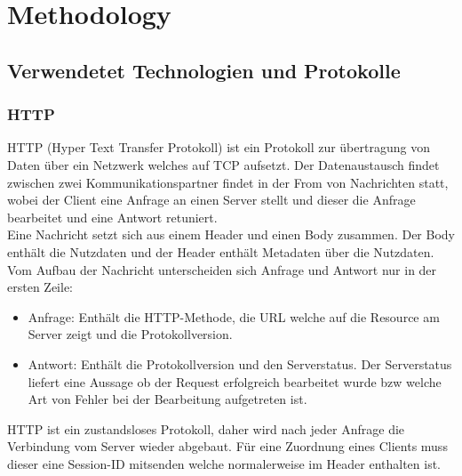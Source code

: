 \section{Methodology}
\label{sec:methodology}

\subsection{Verwendetet Technologien und Protokolle}
\label{sec:Verwendetet Technologien}

\subsubsection{HTTP}
\label{sec:HTTP}

HTTP (Hyper Text Transfer Protokoll) ist ein Protokoll zur übertragung von Daten über ein Netzwerk welches auf TCP aufsetzt.
Der Datenaustausch findet zwischen zwei Kommunikationspartner findet in der From von Nachrichten statt, 
wobei der Client eine Anfrage an einen Server stellt und dieser die Anfrage bearbeitet und eine Antwort retuniert.
\\
Eine Nachricht setzt sich aus einem Header und einen Body zusammen.
Der Body enthält die Nutzdaten und der Header enthält Metadaten über die Nutzdaten.
Vom Aufbau der Nachricht unterscheiden sich Anfrage und Antwort nur in der ersten Zeile:
\begin{itemize}
	\item Anfrage: Enthält die HTTP-Methode, die URL welche auf die Resource am Server zeigt und die Protokollversion.
	\item Antwort: Enthält die Protokollversion und den Serverstatus. 
		Der Serverstatus liefert eine Aussage ob der Request erfolgreich bearbeitet wurde bzw welche Art von Fehler bei der Bearbeitung aufgetreten ist.
\end{itemize}
HTTP ist ein zustandsloses Protokoll, daher wird nach jeder Anfrage die Verbindung vom Server wieder abgebaut.
Für eine Zuordnung eines Clients muss dieser eine Session-ID mitsenden welche normalerweise im Header enthalten ist.

